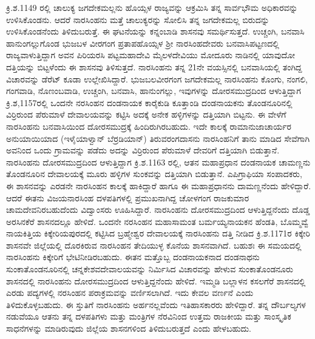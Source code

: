 ಕ್ರಿ.ಶ.1149 ರಲ್ಲಿ ಚಾಲುಕ್ಯ ಜಗದೇಕಮಲ್ಲನು ಹೊಯ್ಸಳ ರಾಜ್ಯವನ್ನು ಆಕ್ರಮಿಸಿ ತನ್ನ ಸಾರ್ವಭೌಮ ಅಧಿಕಾರವನ್ನು ಉಳಿಸಿಕೊಂಡನು. ಆದರೆ ನಾರಸಿಂಹನು ಮತ್ತೆ ಚಾಲುಕ್ಯರನ್ನು ಸೋಲಿಸಿ ತನ್ನ ಜಗದೇಕಮಲ್ಲ ಬಿರುದನ್ನು ಉಳಿಸಿಕೊಂಡನೆಂದು ತಿಳಿದುಬರುತ್ತೆ. ಈ ಘಟನೆಯನ್ನು ಕನ್ನಂಬಾಡಿ ಶಾಸನವು ಸಮರ್ಥಿಸುತ್ತದೆ. ಉಚ್ಚಂಗಿ, ಬನವಾಸಿ ಹಾನುಂಗಲ್ಲುಗೊಂಡ ಭುಜಬಳ ವೀರಗಂಗ ಪ್ರತಾಪಹೊಯ್ಸಳ ಶ‍್ರೀ ನಾರಸಿಂಹದೇವರು ಬನವಾಸಿಪಟ್ಟಣದಲ್ಲಿ ರಾಜ್ಯವಾಳುತ್ತಿದ್ದಾಗ ಅವನ ಪಿರಿಯರಸಿ ಪಟ್ಟಮಹಾದೇವಿ ಮೈಲಳದೇವಿಯು ಮೋದೂರು ನಾಡಿನಲ್ಲಿ ಯಾವುದೋ ದತ್ತಿಯನ್ನು ಬಿಟ್ಟಳೆಂದು ಈ ಶಾಸನವು ತಿಳಿಸುತ್ತದೆ. ನಾರಸಿಂಹನು ತನ್ನ 21ನೇ ವಯಸ್ಸಿನಲ್ಲಿ ಬನವಾಸಿಯಲ್ಲಿ ತಂಗಿದ್ದ ವಿಚಾರವನ್ನು ಡೆರೆಟ್​ ಕೂಡಾ ಉಲ್ಲೇಖಿಸಿದ್ದಾರೆ. ಭುಜಬಲವೀರಗಂಗ ಜಗದೇಕಮಲ್ಲ ನಾರಸಿಂಹನು ಕೊಂಗು, ನಂಗಲಿ, ಗಂಗವಾಡಿ, ನೊಣಂಬವಾಡಿ, ಉಚ್ಚಂಗಿ, ಬನವಾಸಿ, ಹಾನುಂಗಲ್ಲು, ಇವುಗಳನ್ನು ದೋರಸಮುದ್ರದಿಂದ ಆಳುತ್ತಿದ್ದಾಗ ಕ್ರಿ.ಶ,1157ರಲ್ಲಿ ಒಂದನೇ ನರಸಿಂಹನ ದಂಡನಾಯಕ ಕಾರೈಕುಡಿ ಕೂತ್ತಾಂಡಿ ದಂಡನಾಯಕನು ತೊಂಡನೂರಿನಲ್ಲಿ ವಿರ್ರಿರುಂದ ಪೆರುಮಾಳೆ ದೇವಾಲಯವನ್ನು ಕಟ್ಟಿಸಿ ಅದಕ್ಕೆ ಅನೇಕ ಹಳ್ಳಿಗಳನ್ನು ದತ್ತಿಯಾಗಿ ಬಿಟ್ಟನು. ಈ ವೇಳೆಗೆ ನಾರಸಿಂಹನು ಬನವಾಸಿಯಿಂದ ದೋರಸಮುದ್ರಕ್ಕೆ ಹಿಂದಿರುಗಿರಬಹುದು. ಇದೇ ಕಾಲಕ್ಕೆ ರಾಮಾನುಜಾಚಾರ್ಯರ ಅನುಯಾಯಿಯಾದ (ಇಳೈಯಾಳ್ವಾನ್​ ಬೆರ್ರಡಿಯಾನ್​) ತಿರುವರಂಗದಾಸನು ನಾರಸಿಂಹನಿಗೆ ತಾನು ಮಾಡಿದ ಸೇವೆಗಾಗಿ ಅವನಿಂದ ಒಂದು ಗ್ರಾಮವನ್ನು ಪಡೆದು ಅದನ್ನು ವಿರ್ರಿರುಂದ ಪೆರುಮಾಳೆ ದೇವರಿಗೆ ದತ್ತಿಯಾಗಿ ಬಿಡುತ್ತಾನೆ. ನಾರಸಿಂಹನು ದೋರಸಮುದ್ರದಿಂದ ಆಳುತ್ತಿದ್ದಾಗ ಕ್ರಿ.ಶ.1163 ರಲ್ಲಿ, ಆತನ ಮಹಾಪ್ರಧಾನ ದಂಡನಾಯಕ ಚಾಮಣ್ಣನು ತೊಂಡನೂರಿನ ದೇವಾಲಯಕ್ಕೆ ಮೂರು ಹಳ್ಳಿಗಳ ಸುಂಕವನ್ನು ದತ್ತಿಯಾಗಿ ಬಿಡುತ್ತಾನೆ. ಎಪಿಗ್ರಾಫಿಯಾ ಸಂಪಾದಕರು, ಈ ಶಾಸನವನ್ನು ಎರಡನೇ ನಾರಸಿಂಹನ ಕಾಲಕ್ಕೆ ಹಾಕಿದ್ದಾರೆ ಹಾಗೂ ಈ ಮಹಾಪ್ರಧಾನನು ದಾಮಣ್ಣನೆಂದು ಹೇಳಿದ್ದಾರೆ. ಆದರೆ ಈತನು ವಿಜಯನಾರಸಿಂಹ ದಳಪತಿಗಳಲ್ಲಿ ಪ್ರಮುಖನಾಗಿದ್ದ ಚೋಳಗಂಗ ರಾಜಕುಮಾರ ಚಾಮದೇವನಿರಬಹುದೆಂದು ವಿದ್ವಾಂಸರು ಊಹಿಸಿದ್ದಾರೆ. ನಾರಸಿಂಹನು ದೋರಸಮುದ್ರದಿಂದ ಆಳುತ್ತಿದ್ದನೆಂದು ದೊಡ್ಡ ಅರಸಿನಕೆರೆ ಶಾಸನದಲ್ಲೂ ಹೇಳಿದೆ. ಒಂದನೇ ನರಸಿಂಹನ ಮಹಾಸಾಮಂತ ಬರ್ಮಯ್ಯನಾಯಕನ ಹೆಂಡತಿ, ಬೊಮ್ಮವ್ವೆ ನಾಯಕಿತ್ತಿಯ ಕಿಕ್ಕೇರಿಯಪುರದಲ್ಲಿ ಕಟ್ಟಿಸಿದ ಬ್ರಹ್ಮೇಶ್ವರ ದೇವಾಲಯಕ್ಕೆ ನಾರಸಿಂಹನು ದತ್ತಿ ನೀಡಿದ ಕ್ರಿ.ಶ.1171ರ ಕಿಕ್ಕೇರಿ ಶಾಸನವೇ ಜಿಲ್ಲೆಯಲ್ಲಿ ದೊರಕಿರುವ ನಾರಸಿಂಹನ ತೇದಿಯುಳ್ಳ ಕೊನೆಯ ಶಾಸನವಾಗಿದೆ. ಬಹುಶಃ ಈ ಸಮಯದಲ್ಲಿ ನಾರಸಿಂಹನು ಕಿಕ್ಕೇರಿಗೆ ಭೇಟಿನೀಡಿರಬಹುದು. ಈತನ ಮತ್ತೊಬ್ಬ ದಂಡನಾಯಕನಾದ ದಂಡನಾಥನು ಸುಂಕಾತೊಂಡನೂರಿನಲ್ಲಿ ಚನ್ನಕೇಶವದೇವಾಲಯವನ್ನು ನಿರ್ಮಿಸಿದ ವಿಚಾರವನ್ನು ಹೇಳುವ ಸುಂಕಾತೊಂಡನೂರು ಶಾಸನದಲ್ಲಿ ನಾರಸಿಂಹನು ದೋರಸಮುದ್ರದಿಂದ ಆಳುತ್ತಿದ್ದನೆಂದು ಹೇಳಿದೆ. ಇಮ್ಮಡಿ ಬಲ್ಲಾಳನ ಕಸಲಗೆರೆ ಶಾಸನದಲ್ಲಿ ಎರಡು ಪದ್ಯಗಳಲ್ಲಿ ನರಸಿಂಹನ ಪರಾಕ್ರಮವನ್ನು ವರ್ಣಿಸಲಾಗಿದೆ. ಇದು ಕೇವಲ ವರ್ಣನೆ ಎಂದು ತಿಳಿದುಕೊಳ್ಳಬಹುದು. ಈ ಸ್ತುತಿಗೆ ನಾರಸಿಂಹನು ಅರ್ಹನಲ್ಲವೆಂದು ಇತಿಹಾಸಕಾರರು ಹೇಳಿದ್ದಾರೆ. ತನ್ನ ದೌರ್ಬಲ್ಯಗಳ ನಡುವೆಯೂ ಆತನು ತನ್ನ ದಳಪತಿಗಳು ಮತ್ತು ಮಂತ್ರಿಗಳ ನೆರವಿನಿಂದ ಉತ್ತಮ ರಾಜಕೀಯ ಮತ್ತು ಸಾಂಸ್ಕೃತಿಕ ಸಾಧನೆಗಳನ್ನು ಮಾಡಿರುವುದು ಜಿಲ್ಲೆಯ ಶಾಸನಗಳಿಂದ ತಿಳಿದುಬರುತ್ತದೆ ಎಂದು ಹೇಳಬಹುದು.


